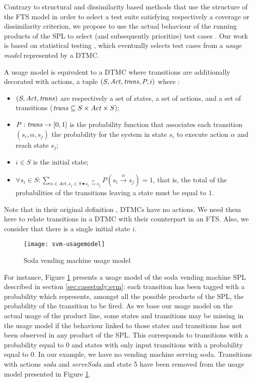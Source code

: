 \label{sec:coverage:usagecrit}

Contrary to structural and dissimilarity based methods that use the structure of the FTS model in order to select a test suite satisfying respectively a coverage or dissimilarity criterion, we propose to use the actual behaviour of the running products of the SPL to select (and subsequently prioritize) test cases \cite{Devroey2015a,Devroey2014}. Our work is based on statistical testing \cite{Whittaker1994}, which eventually selects test cases from a \emph{\gls{usage model}} represented by a \acrfull{DTMC}. 
%
\begin{definition}
\label{def:um}
A \gls{usage model} is equivalent to a \gls{DTMC} where transitions are additionally decorated with actions, \ie a tuple $(S, \mathit{Act}, \mathit{trans}, P, i)$ where :
\begin{itemize}
\item $(S, \mathit{Act}, \mathit{trans})$ are respectively a set of states, a set of actions, and a set of transitions ($\mathit{trans} \subseteq S \times \mathit{Act} \times S $);
\item $P : \mathit{trans} \rightarrow [0,1] $ is the probability function that associates each transition $(s_i, \alpha, s_j )$ the probability for the system in state $s_i$ to execute action $\alpha$ and reach state $s_j$;
\item $i \in S$ is the initial state;
\item $\forall s_i \in S : \sum_{\alpha \in Act, s_j \in S \bullet s_i \xrightarrow{\alpha} s_j} P( s_i \xrightarrow{\alpha} s_j ) = 1$, that is, the total of the probabilities of the transitions leaving a state must be equal to $1$.
\end{itemize}
\end{definition}
%
Note that in their original definition \cite{Whittaker1994}, DTMCs have no actions. We need them here to relate transitions in a DTMC with their counterpart in an FTS. Also, we consider that there is a single initial state $i$. 

\begin{figure}
	\centering
	\texttt{[image: svm-usagemodel]}
	\caption{Soda vending machine usage model}
	\label{fig:svmusagemodel}
\end{figure}

For instance, Figure \ref{fig:svmusagemodel} presents a usage model of the soda vending machine SPL described in section \ref{sec:casestudy:svm}: each transition has been tagged with a probability which represents, amongst all the possible products of the SPL, the probability of the transition to be fired. As we base our usage model on the actual usage of the product line, some states and transitions may be missing in the usage model if the behaviour linked to those states and transitions has not been observed in any product of the SPL. This corresponds to transitions with a probability equal to 0 and states with only input transitions with a probability equal to 0. In our example, we have no vending machine serving soda. Transitions with actions \textit{soda} and \textit{serve\-Soda} and state 5 have been removed from the usage model presented in Figure \ref{fig:svmusagemodel}.


